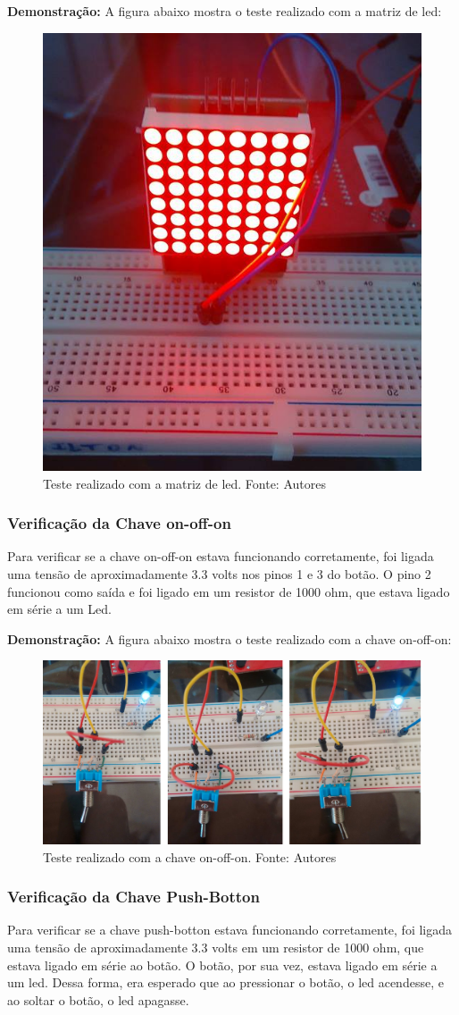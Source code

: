 \documentclass[conference]{IEEEtran}
\begin{document}
\textbf{Demonstração:}
A figura abaixo mostra o teste realizado com a matriz de led:
\begin{figure}[H]
  \centering
  \includegraphics[width=0.5\linewidth]{dem_matriz}
  \caption{Teste realizado com a matriz de led. Fonte: Autores}
  \label{fig:dem_matriz}
\end{figure}

\subsubsection{Verificação da Chave on-off-on}
Para verificar se a chave on-off-on estava funcionando corretamente, foi ligada uma tensão de aproximadamente 3.3 volts nos pinos 1 e 3 do botão. O pino 2 funcionou como saída e foi ligado em um resistor de 1000 ohm, que estava ligado em série a um Led.

%
%
\textbf{Demonstração:}
A figura abaixo mostra o teste realizado com a chave on-off-on:
\begin{figure}[H]
  \centering
  \includegraphics[width=0.5\linewidth]{on-off}
  \caption{Teste realizado com a chave on-off-on. Fonte: Autores}
  \label{fig:dem_on_off}
\end{figure}

\subsubsection{Verificação da Chave Push-Botton}
Para verificar se a chave push-botton estava funcionando corretamente, foi ligada uma tensão de aproximadamente 3.3 volts em um resistor de 1000 ohm, que estava ligado em série ao botão. O botão, por sua vez, estava ligado em série a um led. Dessa forma, era esperado que ao pressionar o botão, o led acendesse, e ao soltar o botão, o led apagasse.
\end{document}
